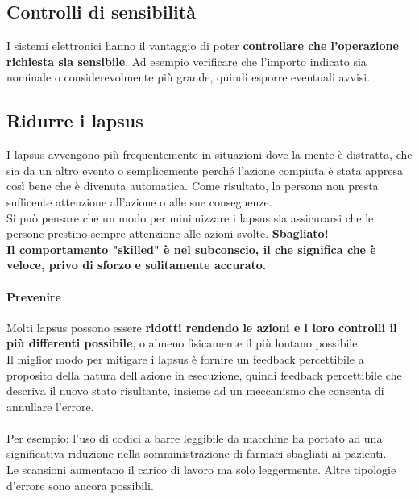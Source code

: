 \documentclass[10pt]{article}
\begin{document}
\subsection{Controlli di sensibilità}
I sistemi elettronici hanno il vantaggio di poter \textbf{controllare che l'operazione richiesta sia sensibile}. Ad esempio verificare che l'importo indicato sia nominale o considerevolmente più grande, quindi esporre eventuali avvisi.
\pagebreak
\subsection{Ridurre i lapsus}
I lapsus avvengono più frequentemente in situazioni dove la mente è distratta, che sia da un altro evento o semplicemente perché l'azione compiuta è stata appresa così bene che è divenuta automatica. Come risultato, la persona non presta sufficente attenzione all'azione o alle sue conseguenze.\\
Si può pensare che un modo per minimizzare i lapsus sia assicurarsi che le persone prestino sempre attenzione alle azioni svolte. \textbf{Sbagliato!}\\
\textbf{Il comportamento "skilled" è nel subconscio, il che significa che è veloce, privo di sforzo e solitamente accurato.}
\paragraph{Prevenire} Molti lapsus possono essere \textbf{ridotti rendendo le azioni e i loro controlli il più differenti possibile}, o almeno fisicamente il più lontano possibile.\\
Il miglior modo per mitigare i lapsus è fornire un feedback percettibile a proposito della natura dell'azione in esecuzione, quindi feedback percettibile che descriva il nuovo stato risultante, insieme ad un meccanismo che consenta di annullare l'errore.\\\\
Per esempio: l'uso di codici a barre leggibile da macchine ha portato ad una significativa riduzione nella somministrazione di farmaci sbagliati ai pazienti.\\
Le scansioni aumentano il carico di lavoro ma solo leggermente. Altre tipologie d'errore sono ancora possibili.
\end{document}

